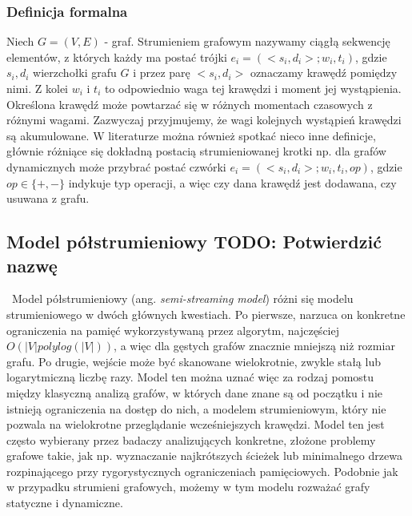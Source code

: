         \subsubsection*{Definicja formalna}
            Niech $G = (V,E)$ - graf. Strumieniem grafowym nazywamy ciągłą sekwencję elementów, z których każdy ma postać trójki $e_i = (<s_i, d_i>; w_i, t_i)$, gdzie $s_i, d_i$ wierzchołki grafu $G$ i przez parę $<s_i, d_i>$ oznaczamy krawędź pomiędzy nimi. Z kolei $w_i$ i $t_i$ to odpowiednio waga tej krawędzi i moment jej wystąpienia. Określona krawędź może powtarzać się w różnych momentach czasowych z różnymi wagami. Zazwyczaj przyjmujemy, że wagi kolejnych wystąpień krawędzi są akumulowane. W literaturze można również spotkać nieco inne definicje, głównie różniące się dokładną postacią strumieniowanej krotki np. dla grafów dynamicznych może przybrać postać czwórki $e_i = (<s_i, d_i>; w_i, t_i, op)$, gdzie $op \in \{+, -\}$ indykuje typ operacji, a więc czy dana krawędź jest dodawana, czy usuwana z grafu\cite{Pacaci_Bonifati_Özsu_2020}.    
        
        

    \subsection{Model półstrumieniowy TODO: Potwierdzić nazwę}\
        Model półstrumieniowy\cite{Feigenbaum_Kannan_McGregor_Suri_Zhang_2005} (ang. \emph{semi-streaming model}) różni się modelu strumieniowego w dwóch głównych kwestiach. Po pierwsze, narzuca on konkretne ograniczenia na pamięć wykorzystywaną przez algorytm, najczęściej $O(|V| polylog(|V|))$, a więc dla gęstych grafów znacznie mniejszą niż rozmiar grafu. Po drugie, wejście może być skanowane wielokrotnie, zwykle stałą lub logarytmiczną liczbę razy. Model ten można uznać więc za rodzaj pomostu między klasyczną analizą grafów, w których dane znane są od początku i nie istnieją ograniczenia na dostęp do nich, a modelem strumieniowym, który nie pozwala na wielokrotne przeglądanie wcześniejszych krawędzi. Model ten jest często wybierany przez badaczy analizujących konkretne, złożone problemy grafowe takie, jak np.  wyznaczanie najkrótszych ścieżek \cite{Elkin_Trehan_2022} lub minimalnego drzewa rozpinającego \cite{Ahn_Guha_McGregor_2012} przy rygorystycznych ograniczeniach pamięciowych. Podobnie jak w przypadku strumieni grafowych, możemy w tym modelu rozważać grafy statyczne i dynamiczne.

